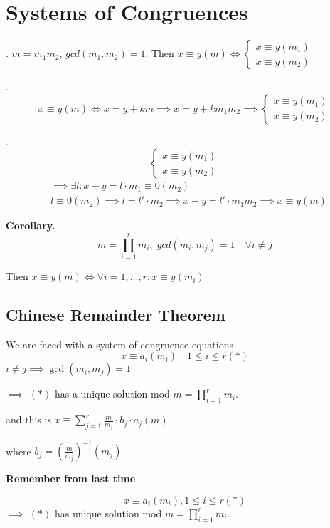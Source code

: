 
\section{Systems of Congruences}

\Theorem.
$m = m_1 m_2$, $gcd(m_1, m_2) = 1$. Then $x \equiv y (m) \iff \begin{cases} x \equiv y (m_1) \\ x \equiv y (m_2) \end{cases}$

\ProofForward.
\[
  x \equiv y (m) \iff x = y + km \implies x = y + k m_1 m_2 \implies
  \begin{cases}
    x \equiv y (m_1) \\
    x \equiv y (m_2)
  \end{cases}
\]

\ProofBackward.
\[
  \begin{cases}
    x \equiv y (m_1) \\
    x \equiv y (m_2)
  \end{cases}
\]
\begin{align*}
  & \implies \exists l: x-y = l\cdot m_1 \equiv 0 (m_2)\\
  & l \equiv 0 (m_2) \implies l = l' \cdot m_2
    \implies x-y = l'\cdot m_1 m_2
    \implies x \equiv y (m)
\end{align*}

\textbf{Corollary.}
\[
  m = \prod_{i=1}^r m_i,\; gcd(m_i, m_j) = 1 \quad \forall i \neq j
\]

Then $x \equiv y (m) \iff \forall i = 1, \ldots, r : x \equiv y (m_i)$

\subsection{Chinese Remainder Theorem}
We are faced with a system of congruence equations
\[
  x \equiv a_i (m_i) \quad 1 \leq i \leq r (*)
\]
$i \neq j \implies \gcd(m_i, m_j) = 1$

$\implies$ $(*)$ has a unique solution mod $\displaystyle{m = \prod_{i = 1}^r m_i}$.

and this is $\displaystyle{x \equiv \sum_{j=1}^r \frac {m}{m_j} \cdot b_j \cdot a_j (m)}$

where $b_j = \left( \frac{m}{m_j} \right) ^{-1} (m_j)$

\textbf{Remember from last time}

\[
  x \equiv a_i (m_i), 1 \leq i \leq r (*)
\]
$\implies$ $(*)$ has unique solution mod $\displaystyle{m = \prod_{i = 1}^r m_i}$.

